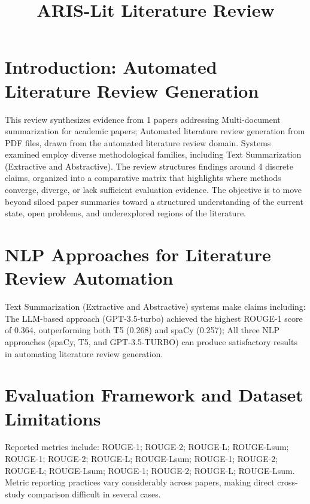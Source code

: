 \documentclass{article}
\title{ARIS-Lit Literature Review}
\begin{document}
\maketitle
\section{Introduction: Automated Literature Review Generation}
This review synthesizes evidence from 1 papers addressing Multi-document summarization for academic papers; Automated literature review generation from PDF files, drawn from the automated literature review domain. Systems examined employ diverse methodological families, including Text Summarization (Extractive and Abstractive). The review structures findings around 4 discrete claims, organized into a comparative matrix that highlights where methods converge, diverge, or lack sufficient evaluation evidence. The objective is to move beyond siloed paper summaries toward a structured understanding of the current state, open problems, and underexplored regions of the literature.

\section{NLP Approaches for Literature Review Automation}
Text Summarization (Extractive and Abstractive) systems make claims including: The LLM-based approach (GPT-3.5-turbo) achieved the highest ROUGE-1 score of 0.364, outperforming both T5 (0.268) and spaCy (0.257); All three NLP approaches (spaCy, T5, and GPT-3.5-TURBO) can produce satisfactory results in automating literature review generation.

\section{Evaluation Framework and Dataset Limitations}
Reported metrics include: ROUGE-1; ROUGE-2; ROUGE-L; ROUGE-Lsum; ROUGE-1; ROUGE-2; ROUGE-L; ROUGE-Lsum; ROUGE-1; ROUGE-2; ROUGE-L; ROUGE-Lsum; ROUGE-1; ROUGE-2; ROUGE-L; ROUGE-Lsum. Metric reporting practices vary considerably across papers, making direct cross-study comparison difficult in several cases.
\end{document}
